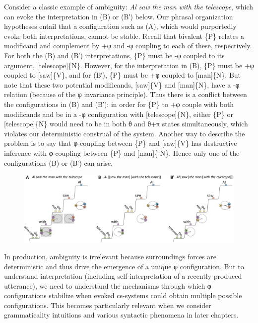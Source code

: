  Consider a classic example of ambiguity: \textit{Al} \textit{saw} \textit{the} \textit{man} \textit{with} \textit{the} \textit{telescope}, which can evoke the interpretation in (B) or (B′) below. Our phrasal organization hypotheses entail that a configuration such as (A), which would purportedly evoke both interpretations, cannot be stable. Recall that bivalent \{P\} relates a modificand and complement by +φ and -φ coupling to each of these, respectively. For both the (B) and (B′) interpretations, \{P\} must be -φ coupled to its argument, [telescope]\{N\}. However, for the interpretation in (B), \{P\} must be +φ coupled to [saw]\{V\}, and for (B′), \{P\} must be +φ coupled to [man]\{N\}. But note that these two potential modificands, [saw]\{V\} and [man]\{N\}, have a -φ relation (because of the φ invariance principle). Thus there is a conflict between the configurations in (B) and (B′): in order for \{P\} to +φ couple with both modificands and be in a -φ configuration with [telescope]\{N\}, either \{P\} or [telescope]\{N\} would need to be in both θ and θ+π states simultaneously, which violates our deterministic construal of the system. Another way to describe the problem is to say that φ-coupling between \{P\} and [saw]\{V\} has destructive inference with φ-coupling between \{P\} and [man]\{-N\}. Hence only one of the configurations (B) or (B′) can arise.

  
\begin{figure}
\includegraphics[width=\textwidth]{figures/Tilsen-img89.png}
\caption{\missingcaption}
\label{fig:}
\end{figure}
 

  In production, ambiguity is irrelevant because surroundings forces are deterministic and thus drive the emergence of a unique φ configuration. But to understand interpretation (including self-interpretation of a recently produced utterance), we need to understand the mechanisms through which φ configurations stabilize when evoked cs-systems could obtain multiple possible configurations. This becomes particularly relevant when we consider grammaticality intuitions and various syntactic phenomena in later chapters.


